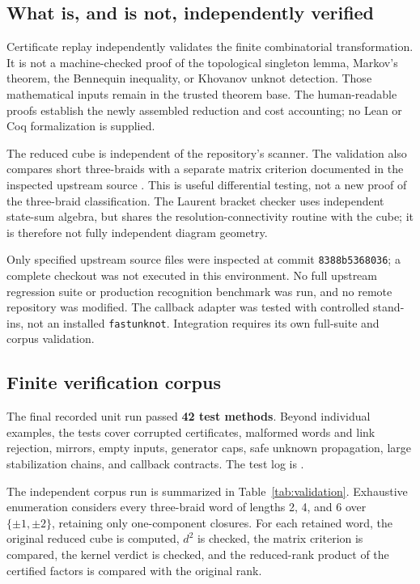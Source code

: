 \documentclass[11pt,letterpaper]{article}
\theoremstyle{definition}
\newcommand{\sourcepin}{\texttt{8388b5368036}}
\begin{document}
\subsection{What is, and is not, independently verified}
Certificate replay independently validates the finite combinatorial transformation. It is not a machine-checked proof of the topological singleton lemma, Markov's theorem, the Bennequin inequality, or Khovanov unknot detection. Those mathematical inputs remain in the trusted theorem base. The human-readable proofs establish the newly assembled reduction and cost accounting; no Lean or Coq formalization is supplied.

The reduced cube is independent of the repository's scanner. The validation also compares short three-braids with a separate matrix criterion documented in the inspected upstream source \cite{braidsource}. This is useful differential testing, not a new proof of the three-braid classification. The Laurent bracket checker uses independent state-sum algebra, but shares the resolution-connectivity routine with the cube; it is therefore not fully independent diagram geometry.

Only specified upstream source files were inspected at commit \sourcepin; a complete checkout was not executed in this environment. No full upstream regression suite or production recognition benchmark was run, and no remote repository was modified. The callback adapter was tested with controlled stand-ins, not an installed \texttt{fastunknot}. Integration requires its own full-suite and corpus validation.

\subsection{Finite verification corpus}
The final recorded unit run passed \textbf{42 test methods}. Beyond individual examples, the tests cover corrupted certificates, malformed words and link rejection, mirrors, empty inputs, generator caps, safe unknown propagation, large stabilization chains, and callback contracts. The test log is .

The independent corpus run is summarized in Table~\ref{tab:validation}. Exhaustive enumeration considers every three-braid word of lengths 2, 4, and 6 over $\{\pm1,\pm2\}$, retaining only one-component closures. For each retained word, the original reduced cube is computed, $d^2$ is checked, the matrix criterion is compared, the kernel verdict is checked, and the reduced-rank product of the certified factors is compared with the original rank.
\end{document}
